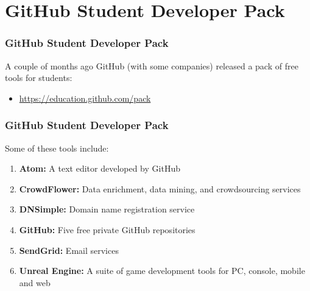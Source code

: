 
\section[GitHub Education]{GitHub Student Developer Pack}

\begin{frame}
\frametitle{GitHub Student Developer Pack}
A couple of months ago GitHub (with some companies) released a pack of free tools for students:
\begin{itemize}
\item \href{https://education.github.com/pack}{https://education.github.com/pack}
\end{itemize}
\end{frame}

\begin{frame}
\frametitle{GitHub Student Developer Pack}
Some of these tools include:
\begin{enumerate}
\item \textbf{Atom:} A text editor developed by GitHub
\pause
\item \textbf{CrowdFlower:} Data enrichment, data mining, and crowdsourcing services
\pause
\item \textbf{DNSimple:} Domain name registration service
\pause
\item \textbf{GitHub:} Five free private GitHub repositories
\pause
\item \textbf{SendGrid:} Email services
\pause
\item \textbf{Unreal Engine:} A suite of game development tools for PC, console, mobile and web
\end{enumerate}
\end{frame}
\note{}